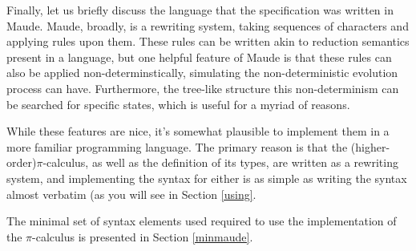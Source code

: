 Finally, let us briefly discuss the language that the specification was written in Maude. Maude, broadly, is a rewriting system, taking sequences of characters and applying rules upon them. These rules can be written akin to reduction semantics present in a language, but one helpful feature of Maude is that these rules can also be applied non-determinstically, simulating the non-deterministic evolution process can have. Furthermore, the tree-like structure this non-determinism can be searched for specific states, which is useful for a myriad of reasons.


While these features are nice, it's somewhat plausible to implement them in a more familiar programming language. The primary reason is that the (higher-order)$\pi$-calculus, as well as the definition of its types, are written as a rewriting system, and implementing the syntax for either is as simple as writing the syntax almost verbatim (as you will see in Section \ref{using}.

The minimal set of syntax elements used required to use the implementation of the $\pi$-calculus is presented in Section \ref{minmaude}.